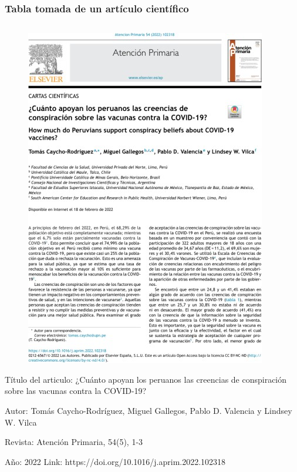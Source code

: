 \documentclass[
11pt, %
]{beamer}
\begin{document}
\begin{frame}
\begin{columns}[c]
\begin{column}{0.5\textwidth}
		\end{column}
	\end{columns}

\end{frame}

\begin{frame}
	\frametitle{Tabla tomada de un artículo científico}

	\begin{columns}[c] %
		\begin{column}{0.5\textwidth} %
			\begin{figure}
				\centering
				\includegraphics[width=0.4\linewidth]{images/screenshot014}
			\end{figure}
			\scriptsize{

				Título del articulo: ¿Cuánto apoyan los peruanos las creencias de conspiración
				sobre las vacunas contra la COVID-19?

				Autor: Tomás Caycho-Rodríguez, Miguel Gallegos, Pablo D. Valencia y Lindsey W.
				Vilca

				Revista: Atención Primaria, 54(5), 1-3

				Año: 2022 Link: https://doi.org/10.1016/j.aprim.2022.102318 }


\end{column}
\end{columns}
\end{frame}
\end{document}
